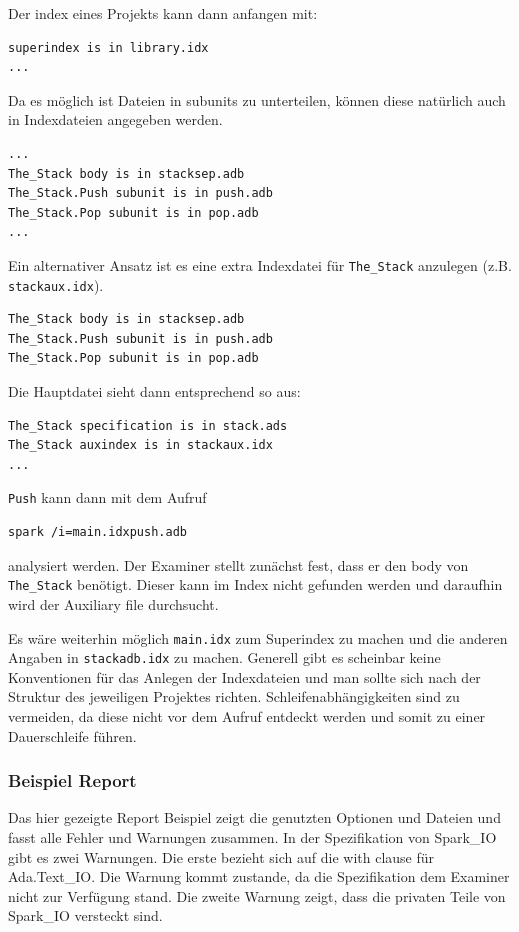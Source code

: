 Der index eines Projekts kann dann anfangen mit:

\begin{verbatim}
superindex is in library.idx
...
\end{verbatim}

Da es möglich ist Dateien in subunits zu unterteilen, können diese natürlich auch in Indexdateien angegeben werden.

\begin{verbatim}
...
The_Stack body is in stacksep.adb
The_Stack.Push subunit is in push.adb
The_Stack.Pop subunit is in pop.adb
...
\end{verbatim}

Ein alternativer Ansatz ist es eine extra Indexdatei für \texttt{The\_Stack} anzulegen (z.B. \texttt{stackaux.idx}).

\begin{verbatim}
The_Stack body is in stacksep.adb
The_Stack.Push subunit is in push.adb
The_Stack.Pop subunit is in pop.adb
\end{verbatim}

Die Hauptdatei sieht dann entsprechend so aus:

\begin{verbatim}
The_Stack specification is in stack.ads
The_Stack auxindex is in stackaux.idx
...
\end{verbatim}

\texttt{Push} kann dann mit dem Aufruf

\begin{verbatim}
spark /i=main.idxpush.adb
\end{verbatim}

analysiert werden.
Der Examiner stellt zunächst fest, dass er den body von \texttt{The\_Stack} benötigt. Dieser kann im Index nicht gefunden werden und daraufhin wird der Auxiliary file durchsucht.

Es wäre weiterhin möglich \texttt{main.idx} zum Superindex zu machen und die anderen Angaben in \texttt{stackadb.idx} zu machen. Generell gibt es scheinbar keine Konventionen für das Anlegen der Indexdateien und man sollte sich nach der Struktur des jeweiligen Projektes richten. Schleifenabhängigkeiten sind zu vermeiden, da diese nicht vor dem Aufruf entdeckt werden und somit zu einer Dauerschleife führen.

\subsubsection{Beispiel Report}
Das hier gezeigte Report Beispiel zeigt die genutzten Optionen und Dateien und fasst alle Fehler und Warnungen zusammen. In der Spezifikation von Spark\_IO gibt es zwei Warnungen. Die erste bezieht sich auf die with clause für Ada.Text\_IO. Die Warnung kommt zustande, da die Spezifikation dem Examiner nicht zur Verfügung stand.
Die zweite Warnung zeigt, dass die privaten Teile von Spark\_IO versteckt sind.

